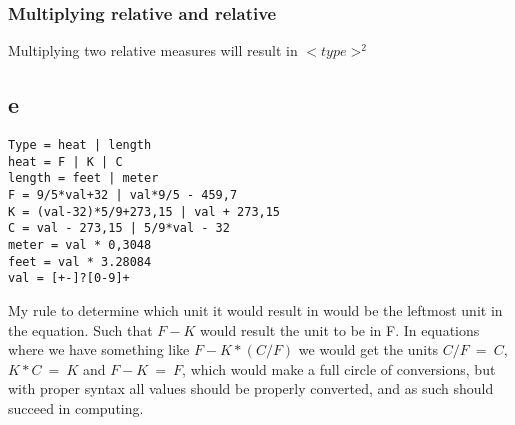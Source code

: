\documentclass[10pt,a4paper]{article}      %
\begin{document}
\subsubsection*{Multiplying relative and relative}
Multiplying two relative measures will result in $<type>^2$

\subsection*{e}

\begin{lstlisting}
Type = heat | length
heat = F | K | C
length = feet | meter
F = 9/5*val+32 | val*9/5 - 459,7
K = (val-32)*5/9+273,15 | val + 273,15
C = val - 273,15 | 5/9*val - 32
meter = val * 0,3048
feet = val * 3.28084
val = [+-]?[0-9]+
\end{lstlisting}

My rule to determine which unit it would result in would be the leftmost unit in the equation. Such that $F - K$ would result the unit to be in F. In equations where we have something like $F - K * (C / F)$ we would get the units $C/F \ = \ C$, $K * C \ = \ K$ and $F - K \ = \ F$, which would make a full circle of conversions, but with proper syntax all values should be properly converted, and as such should succeed in computing.
\end{document}
